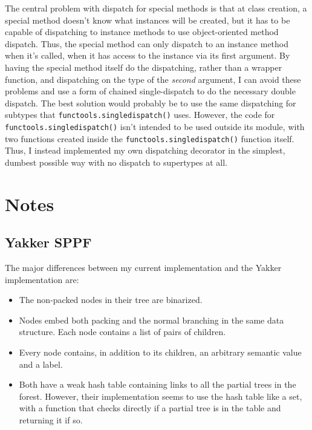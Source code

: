 \documentclass[12pt]{article}
\begin{document}
The central problem with dispatch for special methods is that at class
creation, a special method doesn't know what instances will be
created, but it has to be capable of dispatching to instance methods
to use object-oriented method dispatch.  Thus, the special method can
only dispatch to an instance method when it's called, when it has
access to the instance via its first argument.  By having the special
method itself do the dispatching, rather than a wrapper function, and
dispatching on the type of the \emph{second} argument, I can avoid
these problems and use a form of chained single-dispatch to do the
necessary double dispatch.  The best solution would probably be to use
the same dispatching for subtypes that
\texttt{functools.singledispatch()} uses.  However, the code for
\texttt{functools.singledispatch()} isn't intended to be used outside
its module, with two functions created inside the
\texttt{functools.singledispatch()} function itself.  Thus, I instead
implemented my own dispatching decorator in the simplest, dumbest
possible way with no dispatch to supertypes at all.


\section{Notes}
\label{sec:notes}

\subsection{Yakker SPPF}
\label{sec:yakker_sppf}

The major differences between my current implementation and the Yakker
implementation are:

\begin{itemize}
\item The non-packed nodes in their tree are binarized.
\item Nodes embed both packing and the normal branching in the same
  data structure.  Each node contains a list of pairs of children.
\item Every node contains, in addition to its children, an arbitrary
  semantic value and a label.
\item Both have a weak hash table containing links to all the partial
  trees in the forest.  However, their implementation seems to use the
  hash table like a set, with a function that checks directly if a
  partial tree is in the table and returning it if so.
\end{itemize}
\end{document}
